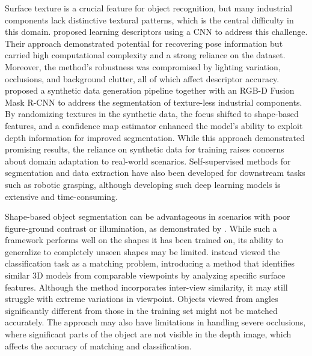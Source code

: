 Surface texture is a crucial feature for object recognition, but many industrial components lack
distinctive textural patterns, which is the central difficulty in this domain.
\citet{wohlhart2015learning} proposed learning descriptors using a CNN to address this challenge.
Their approach demonstrated potential for recovering pose information but carried high computational
complexity and a strong reliance on the dataset. Moreover, the method's robustness was compromised
by lighting variation, occlusions, and background clutter, all of which affect descriptor
accuracy. \citet{back2020segmenting} proposed a synthetic data generation pipeline together with an RGB-D Fusion Mask R-CNN to address the segmentation of texture-less industrial components. By randomizing textures in the synthetic data, the focus shifted to shape-based features, and a confidence map estimator enhanced the model's ability to exploit depth information for improved segmentation. While this approach demonstrated promising results, the reliance on synthetic data for training raises concerns about domain adaptation to real-world scenarios. Self-supervised methods for segmentation and data extraction have also been developed for downstream tasks such as robotic grasping, although developing such deep learning models is extensive and time-consuming.

Shape-based object segmentation can be advantageous in scenarios with poor figure-ground contrast or
illumination, as demonstrated by \citet{borenstein2006shape}. While such a framework performs well
on the shapes it has been trained on, its ability to generalize to completely unseen shapes may be
limited. \citet{wohlkinger2011shape} instead viewed the classification task as a matching problem,
introducing a method that identifies similar 3D models from comparable viewpoints by analyzing
specific surface features. Although the method incorporates inter-view similarity, it may still
struggle with extreme variations in viewpoint. Objects viewed from angles significantly different
from those in the training set might not be matched accurately. The approach may also have
limitations in handling severe occlusions, where significant parts of the object are not visible in
the depth image, which affects the accuracy of matching and classification.

